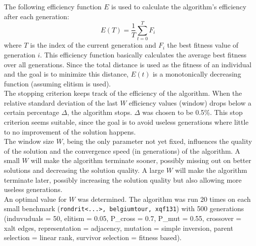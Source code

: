 

The following efficiency function $E$ is used to calculate the algorithm's efficiency after each generation:
\begin{equation}
    E(T) = \frac{1}{T} \sum_{t=0}^T F_i
\end{equation}
where $T$ is the index of the current generation and $F_i$ the best fitness value of generation $i$. This efficiency function basically calculates the average best fitness over all generations. Since the total distance is used as the fitness of an individual and the goal is to minimize this distance, $E(t)$ is a monotonically decreasing function (assuming elitism is used).\\
\newline
The stopping criterion keeps track of the efficiency of the algorithm. When the relative standard deviation of the last $W$ efficiency values (window) drops below a certain percentage $\Delta$, the algorithm stops. $\Delta$ was chosen to be 0.5\%. This stop criterion seems suitable, since the goal is to avoid useless generations where little to no improvement of the solution happens.\\
\newline
The window size $W$, being the only parameter not yet fixed, influences the quality of the solution and the convergence speed (in generations) of the algorithm. A small $W$ will make the algorithm terminate sooner, possibly missing out on better solutions and decreasing the solution quality. A large $W$ will make the algorithm terminate later, possibly increasing the solution quality but also allowing more useless generations.\\
\newline
An optimal value for $W$ was determined. The algorithm was run 20 times on each small benchmark (\texttt{rondrit<...>, belgiumtour, xqf131}) with 500 generations (induvuduals = 50, elitism = 0.05, P\_cross = 0.7, P\_mut = 0.55, crossover = xalt edges, representation = adjacency, mutation = simple inversion, parent selection = linear rank, survivor selection = fitness based). \\
